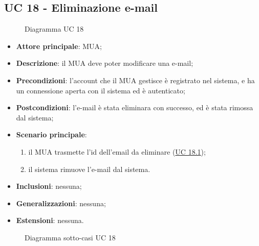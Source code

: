 
\subsection{UC 18 - Eliminazione e-mail} \label{sec:UC18}
    \begin{figure}[h]
        \centering
        \caption{Diagramma UC 18}
    \end{figure}
    \begin{itemize}
        \item \textbf{Attore principale}: MUA;
        \item \textbf{Descrizione}: il MUA deve poter modificare una e-mail;
        \item \textbf{Precondizioni}: l’account che il MUA gestisce è registrato nel sistema, e ha un connessione aperta con il sistema ed è autenticato;
        \item \textbf{Postcondizioni}: l'e-mail è stata eliminara con successo, ed è stata rimossa dal sistema;
        \item \textbf{Scenario principale}:
            \begin{enumerate}
                \item il MUA trasmette l'id dell'email da eliminare (\hyperref[sec:UC18.1]{UC 18.1});
                \item il sistema rimuove l'e-mail dal sistema.
            \end{enumerate}
        \item \textbf{Inclusioni}: nessuna;
        \item \textbf{Generalizzazioni}: nessuna;
        \item \textbf{Estensioni}: nessuna.
    \end{itemize}

    \begin{figure}[h]
        \centering
        \caption{Diagramma sotto-casi UC 18}
    \end{figure}



